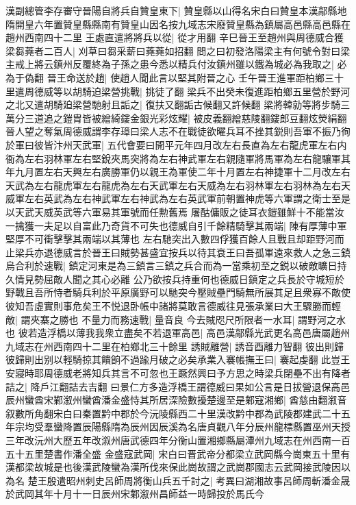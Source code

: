 漢副總管李存審守晉陽自將兵自贊皇東下|{
	贊皇縣以山得名宋白曰贊皇本漢鄗縣地隋開皇六年置贊皇縣縣南有贊皇山因名按九域志宋廢贊皇縣為鎮屬高邑縣高邑縣在趙州西南四十二里}
王處直遣將將兵以從|{
	從才用翻}
辛巳晉王至趙州與周德威合獲梁芻蕘者二百人|{
	刈草曰芻采薪曰蕘蕘如招翻}
問之曰初發洛陽梁主有何號令對曰梁主戒上將云鎮州反覆終為子孫之患今悉以精兵付汝鎮州雖以鐵為城必為我取之|{
	必為于偽翻}
晉王命送於趙|{
	使趙人聞此言以堅其附晉之心}
壬午晉王進軍距柏鄉三十里遣周德威等以胡騎迫梁營挑戰|{
	挑徒了翻}
梁兵不出癸未復進距柏鄉五里營於野河之北又遣胡騎廹梁營馳射且詬之|{
	復扶又翻詬古候翻又許候翻}
梁將韓勍等將步騎三萬分三道追之鎧胄皆被繒綺鏤金銀光彩炫耀|{
	被皮義翻繒慈陵翻鏤郎豆翻炫熒絹翻}
晉人望之奪氣周德威謂李存璋曰梁人志不在戰徒欲曜兵耳不挫其鋭則吾軍不振乃徇於軍曰彼皆汴州天武軍|{
	五代會要曰開平元年四月改左右長直為左右龍虎軍左右内衙為左右羽林軍左右堅銳夾馬突將為左右神武軍左右親隨軍將馬軍為左右龍驤軍其年九月置左右天興左右廣勝軍仍以親王為軍使二年十月置左右神捷軍十二月改左右天武為左右龍虎軍左右龍虎為左右天武軍左右天威為左右羽林軍左右羽林為左右天威軍左右英武為左右神武軍左右神武為左右英武軍前朝置神虎等六軍謂之衛士至是以天武天威英武等六軍易其軍號而任勲舊焉}
屠酤傭販之徒耳衣鎧雖鮮十不能當汝一擒獲一夫足以自富此乃奇貨不可失也德威自引千餘精騎擊其兩端|{
	陳有厚薄中軍堅厚不可衝擊擊其兩端以其薄也}
左右馳突出入數四俘獲百餘人且戰且却距野河而止梁兵亦退德威言於晉王曰賊勢甚盛宜按兵以待其衰王曰吾孤軍遠來救人之急三鎮烏合利於速戰|{
	鎮定河東是為三鎮言三鎮之兵合而為一當乘初至之鋭以破敵曠日持久情見勢屈敵人聞之其心必離}
公乃欲按兵持重何也德威日鎮定之兵長於守城短於野戰且吾所恃者騎兵利於平原廣野可以馳突今壓賊壘門騎無所展其足且衆寡不敵使彼知吾虛實則事危矣王不悦退卧帳中諸將莫敢言德威往見張承業曰大王驟勝而輕敵|{
	謂夾寨之勝也}
不量力而務速戰|{
	量音良}
今去賊咫尺所限者一水耳|{
	謂野河之水也}
彼若造浮橋以薄我我衆立盡矣不若退軍高邑|{
	高邑漢鄗縣光武更名高邑唐屬趙州九域志在州西南四十二里在柏鄉北三十餘里}
誘賊離營|{
	誘音酉離力智翻}
彼出則歸彼歸則出别以輕騎掠其饋餉不過踰月破之必矣承業入褰帳撫王曰|{
	褰起虔翻}
此豈王安寢時耶周德威老將知兵其言不可忽也王蹶然興曰予方思之時梁兵閉壘不出有降者詰之|{
	降戶江翻詰去吉翻}
曰景仁方多造浮橋王謂德威曰果如公言是日拔營退保高邑　辰州蠻酋宋鄴溆州蠻酋潘金盛恃其所居深險數擾楚邊至是鄴寇湘鄉|{
	酋慈由翻溆音叙數所角翻宋白曰秦置黔中郡於今沅陵縣西二十里漢改黔中郡為武陵郡建武二十五年宗均受羣蠻降置辰陽縣隋為辰州因辰溪為名唐貞觀八年分辰州龍標縣置巫州天授三年改沅州大歷五年改溆州唐武德四年分衡山置湘鄉縣屬潭州九域志在州西南一百五十五里楚書作潘全盛}
金盛寇武岡|{
	宋白曰晋武帝分都梁立武岡縣今崗東五十里有漢都梁故城是也後漢武陵蠻為漢所伐來保此崗故謂之武崗郡國志云武岡接武陵因以為名}
楚王殷遣昭州刺史呂師周將衡山兵五千討之|{
	考異曰湖湘故事呂師周斬潘金晟於武岡其年十月十一日辰州宋鄴溆州昌師益一時歸投於馬氏今}


